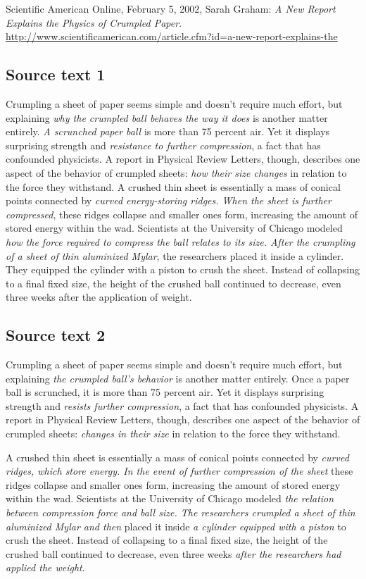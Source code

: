 \documentclass[output=paper]{LSP/langsci}
\begin{document}
Scientific American Online, February 5, 2002, Sarah Graham: \textit{A New Report Explains the Physics of Crumpled Paper}. \url{http://www.scientificamerican.com/article.cfm?id=a-new-report-explains-the}

\subsection*{Source text 1}
Crumpling a sheet of paper seems simple and doesn't require much effort, but explaining \textit{why the crumpled ball behaves the way it does} is another matter entirely. \textit{A scrunched paper ball} is more than 75 percent air. Yet it displays surprising strength and \textit{resistance to further compression}, a fact that has confounded physicists. A report in Physical Review Letters, though, describes one aspect of the behavior of crumpled sheets: \textit{how their size changes} in relation to the force they withstand.
A crushed thin sheet is essentially a mass of conical points connected by \textit{curved energy-storing ridges. When the sheet is further compressed}, these ridges collapse and smaller ones form, increasing the amount of stored energy within the wad. Scientists at the University of Chicago modeled \textit{how the force required to compress the ball relates to its size. After the crumpling of a sheet of thin aluminized Mylar}, the researchers placed it inside a cylinder. They equipped the cylinder with a piston to crush the sheet. Instead of collapsing to a final fixed size, the height of the crushed ball continued to decrease, even three weeks after the application of weight.

\subsection*{Source text 2}
Crumpling a sheet of paper seems simple and doesn't require much effort, but explaining \textit{the crumpled ball’s behavior} is another matter entirely. Once a paper ball is scrunched, it is more than 75 percent air. Yet it displays surprising strength and \textit{resists further compression}, a fact that has confounded physicists. A report in Physical Review Letters, though, describes one aspect of the behavior of crumpled sheets: \textit{changes in their size} in relation to the force they withstand.

A crushed thin sheet is essentially a mass of conical points connected by \textit{curved ridges, which store energy. In the event of further compression of the sheet} these ridges collapse and smaller ones form, increasing the amount of stored energy within the wad. Scientists at the University of Chicago modeled \textit{the relation between compression force and ball size. The researchers crumpled a sheet of thin aluminized Mylar and then} placed it inside \textit{a cylinder equipped with a piston} to crush the sheet. Instead of collapsing to a final fixed size, the height of the crushed ball continued to decrease, even three weeks \textit{after the researchers had applied the weight}.


\printbibliography[heading=subbibliography,notkeyword=this]
\end{document}

